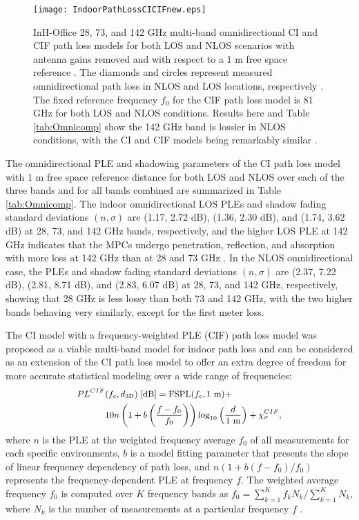 \documentclass[conference]{IEEEtran}
\begin{document}
\begin{figure}    
	\centering
	\texttt{[image: IndoorPathLossCICIFnew.eps]}
	\caption{InH-Office 28, 73, and 142 GHz multi-band omnidirectional CI and CIF path loss models for both LOS and NLOS scenarios with antenna gains removed and with respect to a 1 m free space reference \cite{Sun16b,Mac15b,Samimi15b}. The diamonds and circles represent measured omnidirectional path loss in NLOS and LOS locations, respectively \cite{Ju20a,Mac15b,xing19GC}. The fixed reference frequency $f_0$ for the CIF path loss model is 81 GHz for both LOS and NLOS conditions. Results here and Table \ref{tab:Omnicomp} show the 142 GHz band is lossier in NLOS conditions, with the CI and CIF models being remarkably similar \cite{Sun16b,Mac15b}.}
	\label{fig:140PL}
	\vspace{-0.5cm}
\end{figure}

The omnidirectional PLE and shadowing parameters of the CI path loss model with 1 m free space reference distance for both LOS and NLOS over each of the three bands and for all bands combined are summarized in Table \ref{tab:Omnicomp}. The indoor omnidirectional LOS PLEs and shadow fading standard deviations $(n, \sigma)$ are (1.17, 2.72 dB), (1.36, 2.30 dB), and (1.74, 3.62 dB) at 28, 73, and 142 GHz bands, respectively, and the higher LOS PLE at 142 GHz indicates that the MPCs undergo penetration, reflection, and absorption with more loss at 142 GHz than at 28 and 73 GHz \cite{Rap15a,xing19GC}. In the NLOS omnidirectional case, the PLEs and shadow fading standard deviations $(n, \sigma)$ are  (2.37, 7.22 dB), (2.81, 8.71 dB), and (2.83, 6.07 dB) at 28, 73, and 142 GHz, respectively, showing that 28 GHz is less lossy than both 73 and 142 GHz, with the two higher bands behaving very similarly, except for the first meter loss. 

The CI model with a frequency-weighted PLE (CIF) path loss model \cite{Mac15b,Sun16b} was proposed as a viable multi-band model for indoor path loss and can be considered as an extension of the CI path loss model to offer an extra degree of freedom for more accurate statistical modeling over a wide range of frequencies:
\begin{equation}
\label{equ:CIF}
\small
\begin{split}
PL^{CIF}&(f_c,d_{\text{3D}})\;\text{[dB]} = \text{FSPL}(f_c, \text{1 m})+\\
  &10n\left( 1+ b \left( \dfrac{f-f_0}{f_0}\right) \right) \log_{10}\left( \dfrac{d}{\text{1 m}} \right) + \chi^{CIF}_{\sigma},
\end{split}
\end{equation}
where $n$ is the PLE at the weighted frequency average $f_0$ of all measurements for each specific environments, $b$ is a model fitting parameter that presents the slope of linear frequency dependency of path loss, and $n\left( 1+ b ( {f-f_0})/{f_0} \right)$ represents the frequency-dependent PLE at frequency $f$. The weighted average frequency $f_0$ is computed over $K$ frequency bands as $f_0=\sum_{k=1}^{K}f_kN_k/\sum_{k=1}^{K}N_k$, where $N_k$ is the number of measurements at a particular frequency $f$ \cite{Mac15b,Sun16b}. 
\end{document}
